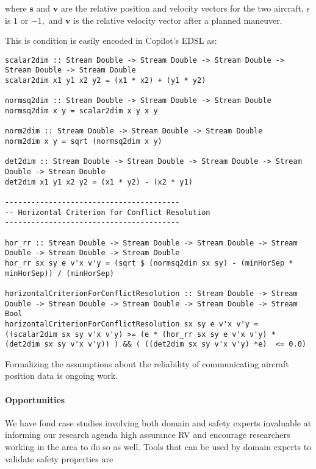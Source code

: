 where $\bm{s}$ and $\bm{v}$ are the  relative position and velocity
vectors for the two aircraft, $\epsilon$ is $1$ or $-1,$  and 
$\bm{v}$ is the relative velocity vector after a planned maneuver. 

This is condition is easily encoded in  Copilot's EDSL as:

\begin{lstlisting}[frame=single]
scalar2dim :: Stream Double -> Stream Double -> Stream Double -> Stream Double -> Stream Double
scalar2dim x1 y1 x2 y2 = (x1 * x2) + (y1 * y2)

normsq2dim :: Stream Double -> Stream Double -> Stream Double
normsq2dim x y = scalar2dim x y x y

norm2dim :: Stream Double -> Stream Double -> Stream Double
norm2dim x y = sqrt (normsq2dim x y)

det2dim :: Stream Double -> Stream Double -> Stream Double -> Stream Double -> Stream Double
det2dim x1 y1 x2 y2 = (x1 * y2) - (x2 * y1)

----------------------------------------
-- Horizontal Criterion for Conflict Resolution
----------------------------------------

hor_rr :: Stream Double -> Stream Double -> Stream Double -> Stream Double -> Stream Double -> Stream Double
hor_rr sx sy e v'x v'y = (sqrt $ (normsq2dim sx sy) - (minHorSep * minHorSep)) / (minHorSep)

horizontalCriterionForConflictResolution :: Stream Double -> Stream Double -> Stream Double -> Stream Double -> Stream Double -> Stream Bool
horizontalCriterionForConflictResolution sx sy e v'x v'y = ((scalar2dim sx sy v'x v'y) >= (e * (hor_rr sx sy e v'x v'y) * (det2dim sx sy v'x v'y)) ) && ( ((det2dim sx sy v'x v'y) *e)  <= 0.0)
\end{lstlisting}

Formalizing the assumptions about the reliability of communicating
aircraft position data is ongoing work. 

\paragraph{Opportunities} We have fond case studies involving both domain and safety experts
invaluable at informing our research agenda  high assurance RV and
encourage researchers working in the area to do so as well. Tools that
can be used by domain experts to validate safety properties are 



 








